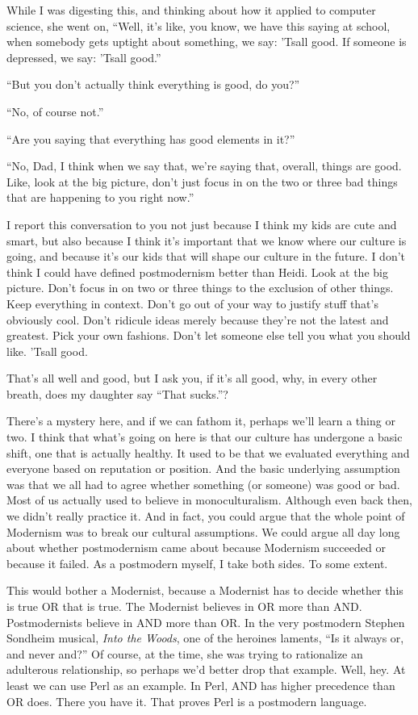 \documentclass[10pt,letterpaper]{article}
\newcommand{\logop}[1]{{\small\MakeUppercase #1\spacefactor1000}}
\begin{document}
While I was digesting this, and thinking about how it applied to computer
science, she went on, ``Well, it's like, you know, we have this saying at
school, when somebody gets uptight about something, we say: 'Tsall good. If
someone is depressed, we say: 'Tsall good.''

``But you don't actually think everything is good, do you?''

``No, of course not.''

``Are you saying that everything has good elements in it?''

``No, Dad, I think when we say that, we're saying that, overall, things are
good. Like, look at the big picture, don't just focus in on the two or three
bad things that are happening to you right now.''

I report this conversation to you not just because I think my kids are cute
and smart, but also because I think it's important that we know where our
culture is going, and because it's our kids that will shape our culture in
the future. I don't think I could have defined postmodernism better than
Heidi. Look at the big picture. Don't focus in on two or three things to the
exclusion of other things. Keep everything in context. Don't go out of your
way to justify stuff that's obviously cool. Don't ridicule ideas merely
because they're not the latest and greatest. Pick your own fashions. Don't
let someone else tell you what you should like. 'Tsall good.

That's all well and good, but I ask you, if it's all good, why, in every
other breath, does my daughter say ``That sucks.''?

There's a mystery here, and if we can fathom it, perhaps we'll learn a thing
or two. I think that what's going on here is that our culture has undergone a
basic shift, one that is actually healthy. It used to be that we evaluated
everything and everyone based on reputation or position. And the basic
underlying assumption was that we all had to agree whether something (or
someone) was good or bad. Most of us actually used to believe in
monoculturalism. Although even back then, we didn't really practice it. And
in fact, you could argue that the whole point of Modernism was to break our
cultural assumptions. We could argue all day long about whether postmodernism
came about because Modernism succeeded or because it failed. As a postmodern
myself, I take both sides. To some extent.

This would bother a Modernist, because a Modernist has to decide whether this
is true \logop{OR} that is true. The Modernist believes in \logop{OR} more than \logop{AND}.
Postmodernists believe in \logop{AND} more than \logop{OR}. In the very postmodern Stephen Sondheim
musical, {\it Into the Woods},
one of the heroines laments, ``Is it
always or, and never and?'' Of course, at the time, she was trying to
rationalize an adulterous relationship, so perhaps we'd better drop that
example. Well, hey. At least we can use Perl as an example. In Perl, \logop{AND} has
higher precedence than \logop{OR} does. There you have it. That proves Perl is a
postmodern language.
\end{document}
